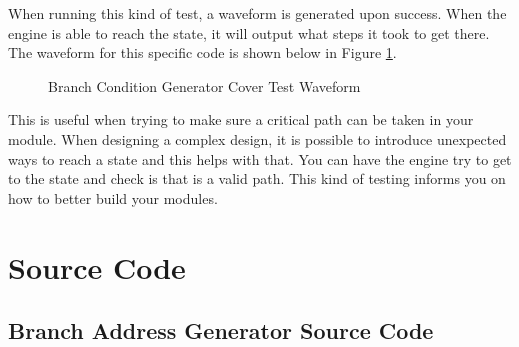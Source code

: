 \documentclass[
    a4paper, %
	12pt, %
    ]{CSSullivanBusinessReport}
\begin{document}
\begin{fullwidth}
When running this kind of test, a waveform is generated upon success. When the engine is able to reach the state, it will output what steps it took to get there. The waveform for this specific code is shown below in Figure \ref{fig:coverOut}.

\begin{figure}[H]
    \centering
    \captionsetup{style=widetable}
    \caption{Branch Condition Generator Cover Test Waveform}
    \label{fig:coverOut}
\end{figure}

This is useful when trying to make sure a critical path can be taken in your module. When designing a complex design, it is possible to introduce unexpected ways to reach a state and this helps with that. You can have the engine try to get to the state and check is that is a valid path. This kind of testing informs you on how to better build your modules.
\newpage
\section{Source Code}
\subsection{Branch Address Generator Source Code} %


\newpage





\end{fullwidth}
\end{document}
